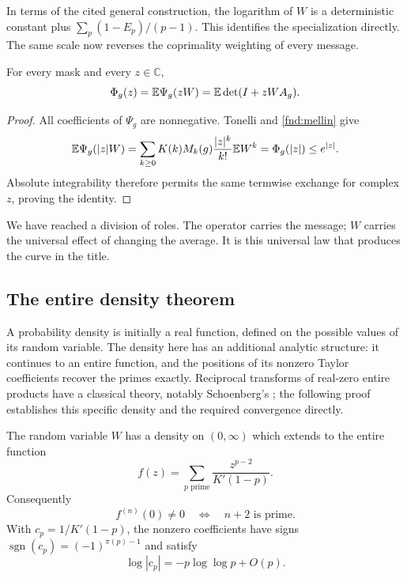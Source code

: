 In terms of the cited general construction, the logarithm of $W$ is
a deterministic constant plus
$\sum_p (1-E_p)/(p-1)$.  This identifies the specialization directly.
The same scale now reverses the coprimality weighting of every message.

\begin{corollary}\label{fnd:bridge}
For every mask and every $z\in\mathbb C$,
\begin{equation}
 \Phi_g(z)=\mathbb E\Psi_g(zW)=\mathbb E\det(I+zWA_g).
 \label{fnd:bridge-equation}
\end{equation}
\end{corollary}
\begin{proof}
All coefficients of $\Psi_g$ are nonnegative.  Tonelli and
\eqref{fnd:mellin} give
\[
 \mathbb E\Psi_g(|z|W)=
 \sum_{k\ge0}K(k)M_k(g)\frac{|z|^k}{k!}\mathbb E W^k
 =\Phi_g(|z|)\le e^{|z|}.
\]
Absolute integrability therefore permits the same termwise exchange
for complex $z$, proving the identity.
\end{proof}

We have reached a division of roles.  The operator carries the
message; $W$ carries the universal effect of changing the average.
It is this universal law that produces the curve in the title.

\subsection{The entire density theorem}

A probability density is initially a real function, defined on the
possible values of its random variable.  The density here has an
additional analytic structure: it continues to an entire function,
and the positions of its nonzero Taylor coefficients recover the
primes exactly.  Reciprocal transforms of real-zero entire products
have a classical theory, notably Schoenberg's
\cite{fndSchoenberg1947}; the following proof establishes this
specific density and the required convergence directly.

\begin{theorem}\label{fnd:entire-density}
The random variable $W$ has a density on $(0,\infty)$ which extends
to the entire function
\begin{equation}
 f(z)=\sum_{p\text{ prime}}\frac{z^{p-2}}{K'(1-p)}.
 \label{fnd:density-series}
\end{equation}
Consequently
\begin{equation}
 f^{(n)}(0)\ne0\quad\Longleftrightarrow\quad n+2\text{ is prime}.
 \label{fnd:prime-taylor-support}
\end{equation}
With $c_p=1/K'(1-p)$, the nonzero coefficients have signs
$\operatorname{sgn}(c_p)=(-1)^{\pi(p)-1}$ and satisfy
\begin{equation}
 \log|c_p|=-p\log\log p+O(p).
 \label{fnd:residue-decay}
\end{equation}
\end{theorem}

